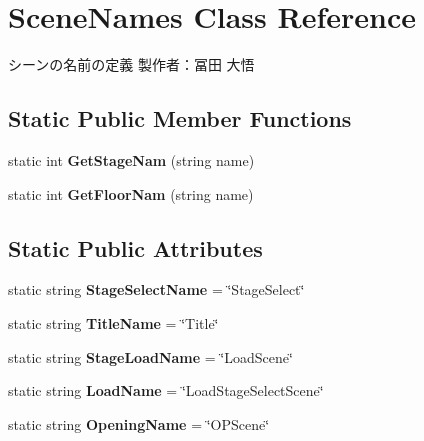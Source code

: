 \hypertarget{class_scene_names}{}\section{Scene\+Names Class Reference}
\label{class_scene_names}


シーンの名前の定義 製作者：冨田 大悟  


\subsection*{Static Public Member Functions}
\begin{DoxyCompactItemize}
\item 
\mbox{\label{class_scene_names_a5584cdc3a6fec4789ae1f70a54b093bb}} 
static int {\bfseries Get\+Stage\+Nam} (string name)
\item 
\mbox{\label{class_scene_names_a5b4ee6bf93c8542563ba2bdf26943c9f}} 
static int {\bfseries Get\+Floor\+Nam} (string name)
\end{DoxyCompactItemize}
\subsection*{Static Public Attributes}
\begin{DoxyCompactItemize}
\item 
\mbox{\label{class_scene_names_ad677aee49c4b3c963e9293ee2ad9db6e}} 
static string {\bfseries Stage\+Select\+Name} = \char`\"{}Stage\+Select\char`\"{}
\item 
\mbox{\label{class_scene_names_a991a62f4db92eb5b712cdbd9fc34b766}} 
static string {\bfseries Title\+Name} = \char`\"{}Title\char`\"{}
\item 
\mbox{\label{class_scene_names_aef6e3ddd7aa1253d1233ef26e4f03068}} 
static string {\bfseries Stage\+Load\+Name} = \char`\"{}Load\+Scene\char`\"{}
\item 
\mbox{\label{class_scene_names_a11bba3c3d690fc1356265dca1e71e8d1}} 
static string {\bfseries Load\+Name} = \char`\"{}Load\+Stage\+Select\+Scene\char`\"{}
\item 
\mbox{\label{class_scene_names_a4641be1a7125f6e516446be9eb3fff23}} 
static string {\bfseries Opening\+Name} = \char`\"{}O\+P\+Scene\char`\"{}
\end{DoxyCompactItemize}



